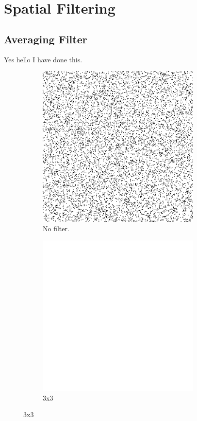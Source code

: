 \section{Spatial Filtering}
\subsection{Averaging Filter}
Yes hello I have done this.

\begin{figure}[H]
    \centering

    \begin{subfigure}[b]{0.3\textwidth}
        \includegraphics[width=0.9\textwidth]{../code/2_out/2-1_sp.png}
        \caption{No filter.}
        \label{fig:2-1:1}
    \end{subfigure}
    \begin{subfigure}[b]{0.3\textwidth}
        \includegraphics[width=0.9\textwidth]{../code/2_out/2-1_sp_3x3.png}
        \caption{3x3}
        \label{fig:2-1:2}
    \end{subfigure}


\end{figure}
